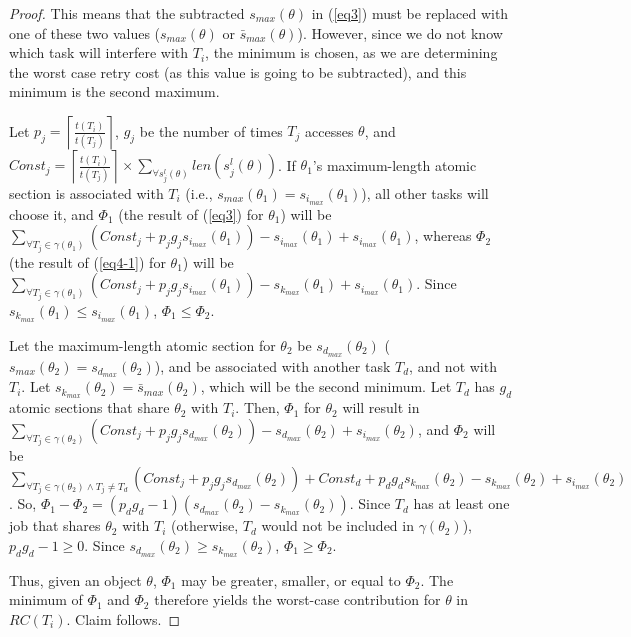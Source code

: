 \documentclass{sig-alternate}
\begin{document}
\begin{proof}
This means that the subtracted $s_{max}(\theta)$ in (\ref{eq3})
must be replaced with one of these two values ($s_{max}(\theta)$ or $\bar{s}_{max}(\theta)$). However, since we do not know  which task will interfere with $T_i$, the minimum is chosen, as we are determining the worst case retry cost (as this value is going to be subtracted),
and this minimum is the second maximum.


Let $p_j = \left\lceil{\frac{t(T_{i})}{t(T_{j})}}\right\rceil$,
$g_j$ be the number of times $T_j$ accesses $\theta$,  
and 
$Const_j = \left\lceil{\frac{t(T_{i})}{t(T_{j})}}\right\rceil \times \sum_{\forall{s_{j}^{l}(\theta)}}{len(s_{j}^{l}(\theta))}$. 
If $\theta_1$'s maximum-length atomic section is associated with $T_i$ (i.e., $s_{max}(\theta_1)=s_{i_{max}}(\theta_1)$), all other tasks will choose it, and $\Phi_1$ (the result of (\ref{eq3}) for $\theta_1$) will be 
$\sum_{\forall {T_j \in \gamma(\theta_1)}} \left(Const_j +p_j g_j s_{i_{max}}(\theta_1)\right)-s_{i_{max}}(\theta_1)+s_{i_{max}}(\theta_1)$,
whereas $\Phi_2$ (the result of (\ref{eq4-1}) for $\theta_1$) will be $\sum_{\forall {T_j \in \gamma(\theta_1)}} \left(Const_j+ p_j g_j s_{i_{max}}(\theta_1)\right)-s_{k_{max}}(\theta_1)+s_{i_{max}}(\theta_1)$. 
Since $s_{k_{max}}(\theta_1)\leq s_{i_{max}}(\theta_1)$, $\Phi_1 \le \Phi_2$.


Let the maximum-length atomic section for $\theta_2$ be $s_{d_{max}}(\theta_2)$  
($s_{max}(\theta_2)=s_{d_{max}}(\theta_2)$), 
and be associated with another task $T_{d}$, and not with $T_{i}$. Let $ s_{k_{max}}(\theta_2) = \bar{s}_{max}(\theta_2)$,  which will be the second minimum. 
Let $T_{d}$ has $g_d$ atomic sections that share $\theta_2$ with $T_i$. Then, $\Phi_1$ 
for $\theta_2$ will result in $\sum_{\forall T_j \in \gamma(\theta_2)} \left(Const_j +p_j g_j s_{d_{max}}(\theta_2)\right) -s_{d_{max}}(\theta_2)+s_{i_{max}}(\theta_2)$,
and $\Phi_2$ will be $\sum_{\forall T_j \in \gamma(\theta_2) \wedge T_j \ne T_d} \left(Const_j+ p_j g_j s_{d_{max}}(\theta_2)\right)+ Const_d+p_d g_d s_{k_{max}}(\theta_2) -s_{k_{max}}(\theta_2)+s_{i_{max}}(\theta_2)$. So, $\Phi_1 - \Phi_2 =(p_d g_d -1)(s_{d_{max}}(\theta_2)-s_{k_{max}}(\theta_2))$. Since $T_d$ has at least one job that shares $\theta_2$ with $T_i$ (otherwise, $T_d$ would not be included in $\gamma (\theta_2)$), $p_d g_d -1 \ge 0$. Since $s_{d_{max}}(\theta_2) \ge s_{k_{max}}(\theta_2)$, $\Phi_1 \ge \Phi_2$. 


Thus, given an object $\theta$, $\Phi_1$ may be greater, smaller, or equal to $\Phi_2$. The minimum of $\Phi_1$ and $\Phi_2$ therefore yields the worst-case contribution for $\theta$ in $RC(T_i)$. Claim follows.
\end{proof}
\end{document}
